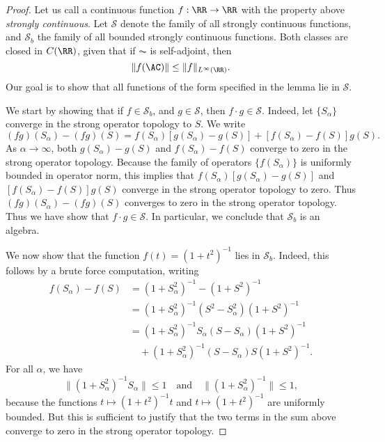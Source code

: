 \begin{proof}
    Let us call a continuous function $f: \RR \to \RR$ with the property above \emph{strongly continuous}. Let $\mathcal{S}$ denote the family of all strongly continuous functions, and $\mathcal{S}_b$ the family of all bounded strongly continuous functions. Both classes are closed in $C(\RR)$, given that if $\AC$ is self-adjoint, then
    \[ \| f(\AC) \| \leq \| f \|_{L^\infty(\RR)}. \]
    Our goal is to show that all functions of the form specified in the lemma lie in $\mathcal{S}$.

    We start by showing that if $f \in \mathcal{S}_b$, and $g \in \mathcal{S}$, then $f \cdot g \in \mathcal{S}$. Indeed, let $\{ S_\alpha \}$ converge in the strong operator topology to $S$. We write
    \[ (fg)(S_\alpha) - (fg)(S) = f(S_\alpha)[ g(S_\alpha) - g(S) ] + [f(S_\alpha) - f(S)] g(S). \]
    As $\alpha \to \infty$, both $g(S_\alpha) - g(S)$ and $f(S_\alpha) - f(S)$ converge to zero in the strong operator topology. Because the family of operators $\{ f(S_\alpha) \}$ is uniformly bounded in operator norm, this implies that $f(S_\alpha)[ g(S_\alpha) - g(S) ]$ and $[f(S_\alpha) - f(S)] g(S)$ converge in the strong operator topology to zero. Thus $(fg)(S_\alpha) - (fg)(S)$ converges to zero in the strong operator topology. Thus we have show that $f \cdot g \in \mathcal{S}$. In particular, we conclude that $\mathcal{S}_b$ is an algebra.

    We now show that the function $f(t) = (1 + t^2)^{-1}$ lies in $\mathcal{S}_b$. Indeed, this follows by a brute force computation, writing
    \begin{align*}
        f(S_\alpha) - f(S) &= (1 + S_\alpha^2)^{-1} - (1 + S^2)^{-1}\\
        &= (1 + S_\alpha^2)^{-1} (S^2 - S_\alpha^2) (1 + S^2)^{-1}\\
        &= (1 + S_\alpha^2)^{-1} S_\alpha (S - S_\alpha) (1 + S^2)^{-1}\\
        &\quad + (1 + S_\alpha^2)^{-1} (S - S_\alpha) S (1 + S^2)^{-1}.
    \end{align*}
    For all $\alpha$, we have
    \[ \| (1 + S_\alpha^2)^{-1} S_\alpha \| \leq 1 \quad\text{and}\quad \| (1 + S_\alpha^2)^{-1} \| \leq 1, \]
    because the functions $t \mapsto (1 + t^2)^{-1} t$ and $t \mapsto (1 + t^2)^{-1}$ are uniformly bounded. But this is sufficient to justify that the two terms in the sum above converge to zero in the strong operator topology.


\end{proof}
